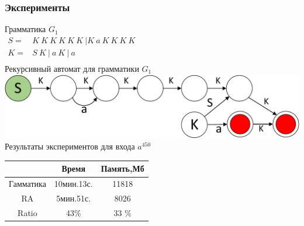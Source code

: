\documentclass{beamer}
\begin{document}
	\begin{frame} 
		\frametitle{Эксперименты}
		\begin{center}
		\vspace{-10pt}
		Грамматика $G_1$\\
		\vspace{6pt}
		$
		\begin{array}{rl}
		S =& K\ K\ K\ K\ K\ K \ | K\ a\ K\ K\ K\ K \\
		K =& S\ K\ |\ a\ K\ |\ a \\
		\end{array}
		$
		\\
		\vspace{5pt}
		Рекурсивный автомат для грамматики $G_1$
		\\
		\vspace{3pt}
		\includegraphics[scale=.5]{pictures/G1automaton.pdf}
		\\
		\vspace{5pt}
		Результаты экспериментов для входа $a^{450}$
		\\
		\vspace{2pt}
            \begin{tabular}{ | c | c | c | }
                \hline
                & Время &   Память,Мб\\ \hline
                Гамматика& 10мин.13с.  &  11818 \\ \hline 
                RA       & 5мин.51с.  & 8026  \\ \hline \hline
                Ratio   &  43$\%$       &  33 $\%$ \\ \hline
            \end{tabular}
        \end{center}
	\end{frame}
	
\end{document}
